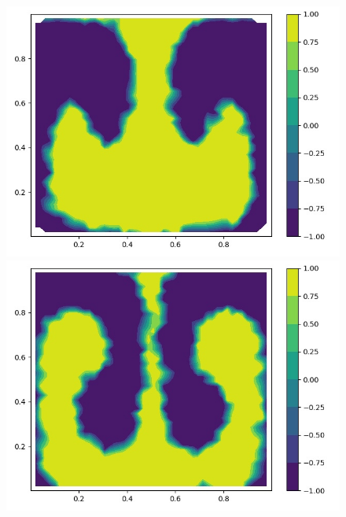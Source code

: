 \documentclass[a4paper, 14pt]{extarticle}
\begin{document}
		\begin{figure}[H]
			\begin{minipage}{0.5\textwidth}
				\centering
				\includegraphics[width = \linewidth]{3.jpg}
			\end{minipage}\hfill
			\begin{minipage}{0.5\textwidth}
				\centering
				\includegraphics[width = \linewidth]{4.jpg}
			\end{minipage}\hfill
		\end{figure}
	
\end{document}
